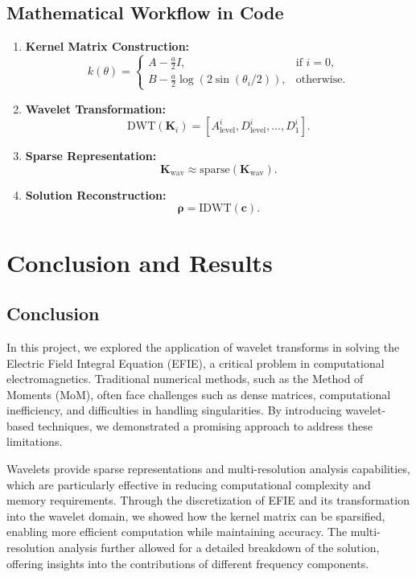 \documentclass[12pt]{article}
\begin{document}
\subsection{Mathematical Workflow in Code}
\begin{enumerate}
    \item \textbf{Kernel Matrix Construction:}
          \[
              k(\theta) =
              \begin{cases}
                  A - \frac{a}{2}I,                           & \text{if } i = 0, \\
                  B - \frac{a}{2} \log(2 \sin(\theta_i / 2)), & \text{otherwise}.
              \end{cases}
          \]
    \item \textbf{Wavelet Transformation:}
          \[
              \text{DWT}(\mathbf{K}_i) = [A_\text{level}^i, D_\text{level}^i, \dots, D_1^i].
          \]
    \item \textbf{Sparse Representation:}
          \[
              \mathbf{K}_\text{wav} \approx \text{sparse}(\mathbf{K}_\text{wav}).
          \]
    \item \textbf{Solution Reconstruction:}
          \[
              \boldsymbol{\rho} = \text{IDWT}(\mathbf{c}).
          \]
\end{enumerate}

\newpage

\section{Conclusion and Results}
\subsection{Conclusion}
In this project, we explored the application of wavelet transforms in solving the Electric Field Integral Equation (EFIE), a critical problem in computational electromagnetics. Traditional numerical methods, such as the Method of Moments (MoM), often face challenges such as dense matrices, computational inefficiency, and difficulties in handling singularities. By introducing wavelet-based techniques, we demonstrated a promising approach to address these limitations.

Wavelets provide sparse representations and multi-resolution analysis capabilities, which are particularly effective in reducing computational complexity and memory requirements. Through the discretization of EFIE and its transformation into the wavelet domain, we showed how the kernel matrix can be sparsified, enabling more efficient computation while maintaining accuracy. The multi-resolution analysis further allowed for a detailed breakdown of the solution, offering insights into the contributions of different frequency components.
\end{document}

